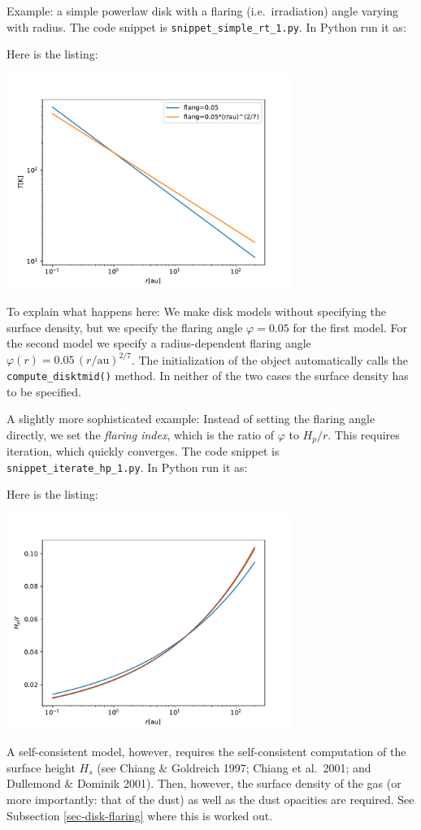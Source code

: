 \documentclass{book}
\newcommand{\code}[1]{{\small\tt #1}}
\begin{document}
Example: a simple powerlaw disk with a flaring (i.e.\ irradiation) angle
varying with radius. The code snippet is
\code{snippet\_simple\_rt\_1.py}. In Python run it as:
\begin{codebox}
\end{codebox}
Here is the listing:

\centerline{\includegraphics[width=0.7\textwidth]{../snippets/fig_snippet_simple_rt_1_1.pdf}}
To explain what happens here: We make disk models without specifying the surface
density, but we specify the flaring angle $\varphi=0.05$ for the first
model. For the second model we specify a radius-dependent flaring angle
$\varphi(r)=0.05\,(r/\mathrm{au})^{2/7}$. The initialization of the object
automatically calls the \code{compute\_disktmid()} method.  In neither of the
two cases the surface density has to be specified.

A slightly more sophisticated example:
Instead of setting the flaring angle directly, we set the {\em flaring index},
which is the ratio of $\varphi$ to $H_p/r$. This requires iteration, which
quickly converges.
The code snippet is
\code{snippet\_iterate\_hp\_1.py}. In Python run it as:
\begin{codebox}
\end{codebox}
Here is the listing:

\centerline{\includegraphics[width=0.7\textwidth]{../snippets/fig_snippet_iterate_hp_1_1.pdf}}
A self-consistent model, however, requires the self-consistent
computation of the surface height $H_s$ (see Chiang \& Goldreich 1997;
Chiang et al.\ 2001; and Dullemond \& Dominik 2001). Then, however, the surface
density of the gas (or more importantly: that of the dust) as well as the dust
opacities are required. See Subsection \ref{sec-disk-flaring} where this is worked out.
\end{document}
